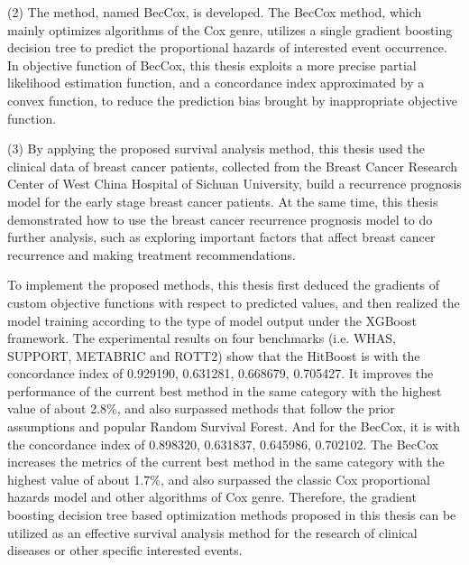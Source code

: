 \begin{englishabstract}
    (2) The method, named BecCox, is developed. The BecCox method, which mainly optimizes algorithms of the Cox genre, utilizes a single gradient boosting decision tree to predict the proportional hazards of interested event occurrence. In objective function of BecCox, this thesis exploits a more precise partial likelihood estimation function, and a concordance index approximated by a convex function, to reduce the prediction bias brought by inappropriate objective function.
    
    (3) By applying the proposed survival analysis method, this thesis used the clinical data of breast cancer patients, collected from the Breast Cancer Research Center of West China Hospital of Sichuan University, build a recurrence prognosis model for the early stage breast cancer patients. At the same time, this thesis demonstrated how to use the breast cancer recurrence prognosis model to do further analysis, such as exploring important factors that affect breast cancer recurrence and making treatment recommendations.

	To implement the proposed methods, this thesis first deduced the gradients of custom objective functions with respect to predicted values, and then realized the model training according to the type of model output under the XGBoost framework. The experimental results on four benchmarks (i.e. WHAS, SUPPORT, METABRIC and ROTT2) show that the HitBoost is with the concordance index of 0.929190, 0.631281, 0.668679, 0.705427. It improves the performance of the current best method in the same category with the highest value of about 2.8\%, and also surpassed methods that follow the prior assumptions and popular Random Survival Forest. And for the BecCox, it is with the concordance index of 0.898320, 0.631837, 0.645986, 0.702102. The BecCox increases the metrics of the current best method in the same category with the highest value of about 1.7\%, and also surpassed the classic Cox proportional hazards model and other algorithms of Cox genre. Therefore, the gradient boosting decision tree based optimization methods proposed in this thesis can be utilized as an effective survival analysis method for the research of clinical diseases or other specific interested events.

\end{englishabstract}
